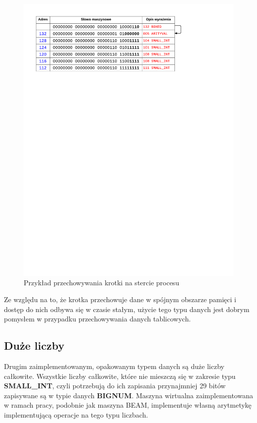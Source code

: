 \begin{figure}[h]
\centerline{\includegraphics[scale=1, clip, trim=10mm 210mm 45mm 10mm]{tuple_on_heap}}
\caption{Przykład przechowywania krotki na stercie procesu}
\label{fig:tupleonheap}
\end{figure}

Ze względu na to, że krotka przechowuje dane w spójnym obszarze pamięci i dostęp do nich odbywa się w czasie stałym, użycie tego typu danych jest dobrym pomysłem w przypadku przechowywania danych tablicowych.

\subsection{Duże liczby}
\label{sub:typyBigs}

Drugim zaimplementowanym, opakowanym typem danych są duże liczby całkowite.
Wszystkie liczby całkowite, które nie mieszczą się w zakresie typu \textbf{SMALL\_INT}, czyli potrzebują do ich zapisania przynajmniej 29 bitów zapisywane są w typie danych \textbf{BIGNUM}.
Maszyna wirtualna zaimplementowana w ramach pracy, podobnie jak maszyna BEAM, implementuje własną arytmetykę implementującą operacje na tego typu liczbach.

